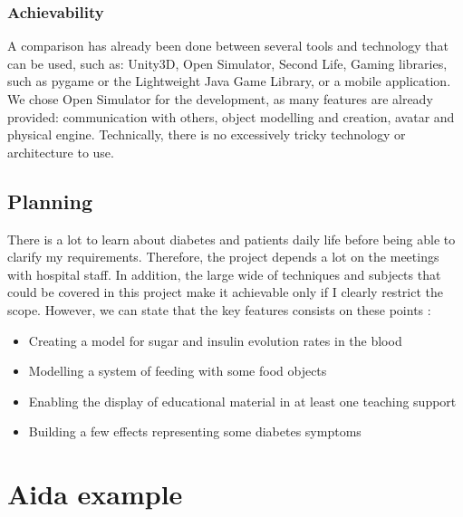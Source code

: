 \documentclass[12pt,MSc]{muthesis}
\begin{document}


\subsection*{Achievability}
A comparison has already been done between several tools and technology that can be used, such as:
Unity3D,
Open Simulator,
Second Life,
Gaming libraries, such as pygame or the Lightweight Java Game Library,
or a mobile application. 
We chose Open Simulator for the development, as many features are already provided: communication with others, object modelling and creation, avatar and physical engine.
Technically, there is no excessively tricky technology or architecture to use.

\section{Planning}

There is a lot to learn about diabetes and patients daily life before being able to clarify my requirements. Therefore, the project depends a lot on the meetings with hospital staff. In addition, the large wide of techniques and subjects that could be covered in this project make it achievable only if I clearly restrict the scope.
However, we can state that the key features consists on these points :
\begin{itemize}
\item Creating a model for sugar and insulin evolution rates in the blood
\item Modelling a system of feeding with some food objects
\item Enabling the display of educational material in at least one teaching support
\item Building a few effects representing some diabetes symptoms
\end{itemize}



\fi

 \appendix
    \chapter{Aida example}
\label{annex1}
\end{document}
